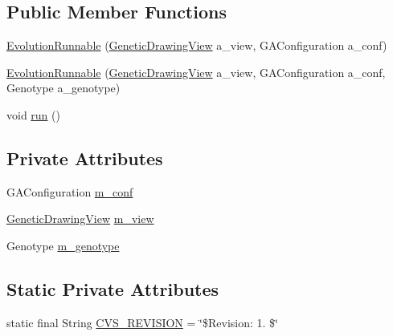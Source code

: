 \subsection*{Public Member Functions}
\begin{DoxyCompactItemize}
\item 
\hyperlink{classexamples_1_1monalisa_1_1gui_1_1_evolution_runnable_a574cc01db02acde726d39abd9f638f8b}{Evolution\-Runnable} (\hyperlink{classexamples_1_1monalisa_1_1gui_1_1_genetic_drawing_view}{Genetic\-Drawing\-View} a\-\_\-view, G\-A\-Configuration a\-\_\-conf)
\item 
\hyperlink{classexamples_1_1monalisa_1_1gui_1_1_evolution_runnable_a57eaaaf189d21138373dbcbe03896d22}{Evolution\-Runnable} (\hyperlink{classexamples_1_1monalisa_1_1gui_1_1_genetic_drawing_view}{Genetic\-Drawing\-View} a\-\_\-view, G\-A\-Configuration a\-\_\-conf, Genotype a\-\_\-genotype)
\item 
void \hyperlink{classexamples_1_1monalisa_1_1gui_1_1_evolution_runnable_a3e49804988110e8186d1a68ac5fa92c5}{run} ()
\end{DoxyCompactItemize}
\subsection*{Private Attributes}
\begin{DoxyCompactItemize}
\item 
G\-A\-Configuration \hyperlink{classexamples_1_1monalisa_1_1gui_1_1_evolution_runnable_af4a5be4b483b1ad52cff191fd76790ad}{m\-\_\-conf}
\item 
\hyperlink{classexamples_1_1monalisa_1_1gui_1_1_genetic_drawing_view}{Genetic\-Drawing\-View} \hyperlink{classexamples_1_1monalisa_1_1gui_1_1_evolution_runnable_a0004454131bb24d61ca55127839d699d}{m\-\_\-view}
\item 
Genotype \hyperlink{classexamples_1_1monalisa_1_1gui_1_1_evolution_runnable_a95b4c7b67895cfdd21c0f2645d106b68}{m\-\_\-genotype}
\end{DoxyCompactItemize}
\subsection*{Static Private Attributes}
\begin{DoxyCompactItemize}
\item 
static final String \hyperlink{classexamples_1_1monalisa_1_1gui_1_1_evolution_runnable_ab61681ab078112fad6e4e10e01252c2d}{C\-V\-S\-\_\-\-R\-E\-V\-I\-S\-I\-O\-N} = \char`\"{}\$Revision\-: 1. \$\char`\"{}
\end{DoxyCompactItemize}



